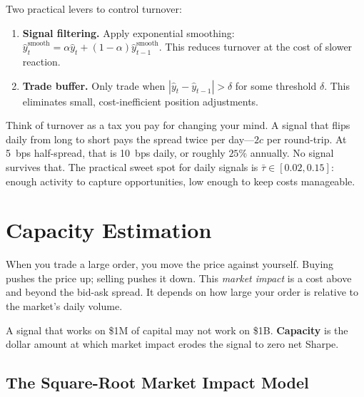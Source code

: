 Two practical levers to control turnover:

\begin{enumerate}[nosep]
\item \textbf{Signal filtering.}  Apply exponential smoothing: $\hat{y}_t^{\text{smooth}} = \alpha \hat{y}_t + (1 - \alpha)\hat{y}_{t-1}^{\text{smooth}}$.  This reduces turnover at the cost of slower reaction.
\item \textbf{Trade buffer.}  Only trade when $|\hat{y}_t - \hat{y}_{t-1}| > \delta$ for some threshold $\delta$.  This eliminates small, cost-inefficient position adjustments.
\end{enumerate}

\begin{intuition}
Think of turnover as a tax you pay for changing your mind.  A signal that flips daily from long to short pays the spread twice per day---$2c$ per round-trip.  At 5~bps half-spread, that is 10~bps daily, or roughly $25\%$ annually.  No signal survives that.  The practical sweet spot for daily signals is $\bar{\tau} \in [0.02, 0.15]$: enough activity to capture opportunities, low enough to keep costs manageable.
\end{intuition}


\section{Capacity Estimation}
\label{sec:capacity}

\begin{prereq}
When you trade a large order, you move the price against yourself.  Buying pushes the price up; selling pushes it down.  This \emph{market impact} is a cost above and beyond the bid-ask spread.  It depends on how large your order is relative to the market's daily volume.
\end{prereq}

A signal that works on \$1M of capital may not work on \$1B.  \textbf{Capacity} is the dollar amount at which market impact erodes the signal to zero net Sharpe.

\subsection{The Square-Root Market Impact Model}

